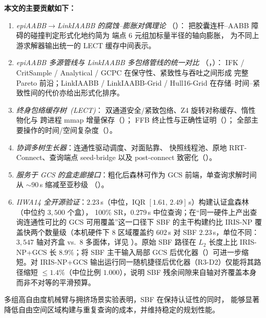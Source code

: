 \documentclass[journal]{IEEEtran}
\begin{document}
\textbf{本文的主要贡献如下：}
\begin{enumerate}[nosep]
  \item \emph{epiAABB$\to$LinkIAABB 的腐蚀--膨胀对偶理论}
  （）：
  把胶囊连杆--AABB 障碍的碰撞判定形式化地约简为
  端点 6 元组加标量半径的轴向膨胀，
  为不同上游求解器输出统一的 LECT 缓存中间表示。

  \item \emph{epiAABB 多源管线与 LinkIAABB 多包络管线的统一对比}
  （，）：
  IFK / CritSample / Analytical / GCPC 在保守性、紧致性与吞吐之间形成
  完整 Pareto 前沿；LinkIAABB / LinkIAABB-Grid / Hull16-Grid
  在存储--时间--紧致性间的代价亦给出形式化排序。

  \item \emph{终身包络缓存树~(LECT)}：
  双通道安全/紧致包络、Z4 旋转对称缓存、惰性物化与
  跨进程 mmap 增量保存（）；
  FFB 终止性与正确性证明（）；
  全部主要操作的时间/空间复杂度（）。

  \item \emph{协调多树生长器}：连通性驱动调度、对面贴靠、
  快照线程池、原地 RRT-Connect、查询端点 seed-bridge
  以及 post-connect 致密化（）。

  \item \emph{服务于 GCS 的盒走廊接口}：粗化后森林可作为
  GCS 前端，单查询求解时间从 $\sim\!90$\,s 缩减至亚秒级
  （）。

  \item \emph{IIWA14 全开源验证}：$2.23$\,s（中位，IQR $[1.61,\,2.49]$\,s）构建认证盒森林（中位约 $3{,}500$ 个盒），
  100\% SR，0.279\,s 中位查询；在“同一硬件上产出查询连通性可比的 GCS 可用覆盖”这一口径下 SBF 的主干构建约比 IRIS-NP 覆盖快两个数量级（本机硬件下 8 区域覆盖约 $602$\,s 对 SBF $2.23$\,s，单位不同：$3{,}547$ 轴对齐盒 vs.\ $8$ 多面体，详见 ）。原始 SBF 路径在 $L_2$ 长度上比 IRIS-NP+GCS 长 $8.9\%$；将 SBF 主干输入局部 GCS 后优化器（）可进一步缩短。对 IRIS-NP+GCS 输出运行同一随机捷径后优化器（R3-D2）仅能将其路径缩短 $\le 1.4\%$（中位比例 $1.000$），说明 SBF 残余间隙来自轴对齐覆盖本身而非不对等的平滑预算。
\end{enumerate}

多组高自由度机械臂与拥挤场景实验表明，SBF 在保持认证性的同时，
能够显著降低自由空间区域构建与重复查询的成本，并维持稳定的规划性能。
\end{document}
